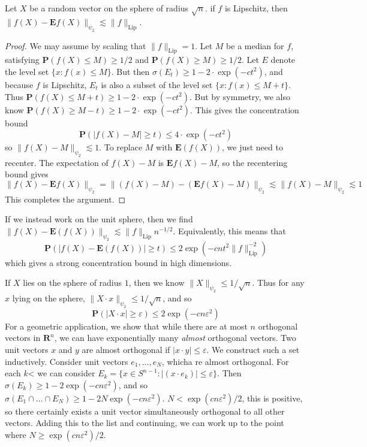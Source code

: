 \begin{theorem}
    Let $X$ be a random vector on the sphere of radius $\sqrt{n}$. if $f$ is Lipschitz, then $\| f(X) - \mathbf{E} f(X) \|_{\psi_2} \lesssim \| f \|_{\text{Lip}}$.
\end{theorem}
\begin{proof}
    We may assume by scaling that $\| f \|_{\text{Lip}} = 1$. Let $M$ be a median for $f$, satisfying $\mathbf{P}(f(X) \leq M) \geq 1/2$ and $\mathbf{P}(f(X) \geq M) \geq 1/2$. Let $E$ denote the level set $\{ x : f(x) \leq M \}$. But then $\sigma(E_t) \geq 1 - 2 \cdot \exp(-ct^2)$, and because $f$ is Lipschitz, $E_t$ is also a subset of the level set $\{ x : f(x) \leq M + t \}$. Thus $\mathbf{P}(f(X) \leq M + t) \geq 1 - 2 \cdot \exp(-ct^2)$. But by symmetry, we also know $\mathbf{P}(f(X) \geq M - t) \geq 1 - 2 \cdot \exp(-ct^2)$. This gives the concentration bound
    \[ \mathbf{P}(|f(X) - M| \geq t) \leq 4 \cdot \exp(-ct^2) \]
    so $\| f(X) - M \|_{\psi_2} \lesssim 1$. To replace $M$ with $\mathbf{E}(f(X))$, we just need to recenter. The expectation of $f(X) - M$ is $\mathbf{E} f(X) - M$, so the recentering bound gives
    \[ \| f(X) - \mathbf{E} f(X) \|_{\psi_2} = \| (f(X) - M) - (\mathbf{E} f(X) - M) \|_{\psi_2} \lesssim \| f(X) - M \|_{\psi_2} \lesssim 1 \]
    This completes the argument.  
\end{proof}

If we instead work on the unit sphere, then we find $\| f(X) - \mathbf{E}(f(X)) \|_{\psi_2} \lesssim \| f \|_{\text{Lip}} n^{-1/2}$. Equivalently, this means that
%
\[ \mathbf{P} \left( |f(X) - \mathbf{E}(f(X))| \geq t \right) \leq 2 \exp(-cn t^2 \| f \|_{\text{Lip}}^{-2}) \]
%
which gives a strong concentration bound in high dimensions.

\begin{example}
    If $X$ lies on the sphere of radius $1$, then we know $\| X \|_{\psi_2} \leq 1/\sqrt{n}$. Thus for any $x$ lying on the sphere, $\| X \cdot x \|_{\psi_2} \leq 1/\sqrt{n}$, and so
    \[ \mathbf{P}(|X \cdot x| \geq \varepsilon) \leq 2\exp(-cn \varepsilon^2) \]
    For a geometric application, we show that while there are at most $n$ orthogonal vectors in $\mathbf{R}^n$, we can have exponentially many {\it almost} orthogonal vectors. Two unit vectors $x$ and $y$ are almost orthogonal if $|x \cdot y| \leq \varepsilon$. We construct such a set inductively. Consider unit vectors $e_1, \dots, e_N$, whicha re almost orthogonal. For each $k$< we can consider $E_k = \{ x \in S^{n-1} : |(x \cdot e_k)| \leq \varepsilon \}$. Then $\sigma(E_k) \geq 1 - 2\exp(-cn\varepsilon^2)$, and so $\sigma(E_1 \cap \dots \cap E_N) \geq 1 - 2N \exp(-cn \varepsilon^2)$. $N < \exp(cn\varepsilon^2)/2$, this is positive, so there certainly exists a unit vector simultaneously orthogonal to all other vectors. Adding this to the list and continuing, we can work up to the point where $N \geq \exp(cn \varepsilon^2)/2$.
\end{example}

